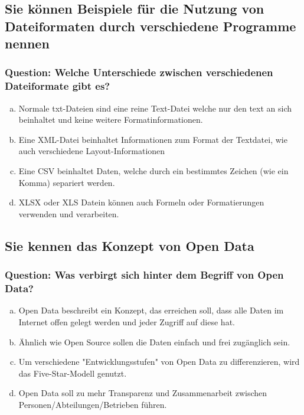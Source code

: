 \documentclass{article}
\begin{document}
\begin{adjustwidth}{2em}{2em}
\begin{adjustwidth}{2em}{2em}
			\subsection{Sie können Beispiele für die Nutzung von Dateiformaten durch verschiedene Programme nennen}
			\begin{adjustwidth}{1em}{}
				\subsubsection*{Question: Welche Unterschiede zwischen verschiedenen Dateiformate gibt es?}
				\begin{adjustwidth}{1em}{}
					\begin{enumerate}[(a)]
						\item Normale txt-Dateien sind eine reine Text-Datei welche nur den text an sich beinhaltet und keine weitere Formatinformationen.
						\item Eine XML-Datei beinhaltet Informationen zum Format der Textdatei, wie auch verschiedene Layout-Informationen
						\item Eine CSV beinhaltet Daten, welche durch ein bestimmtes Zeichen (wie ein Komma) separiert werden.
						\item XLSX oder XLS Datein können auch Formeln oder Formatierungen verwenden und verarbeiten.
					\end{enumerate}
				\end{adjustwidth}
			\end{adjustwidth}
			\subsection{Sie kennen das Konzept von Open Data}
			\begin{adjustwidth}{1em}{}
				\subsubsection*{Question: Was verbirgt sich hinter dem Begriff von Open Data?}
				\begin{adjustwidth}{1em}{}
					\begin{enumerate}[(a)]
						\item Open Data beschreibt ein Konzept, das erreichen soll, dass alle Daten im Internet offen gelegt werden und jeder Zugriff auf diese hat.
						\item Ähnlich wie Open Source sollen die Daten einfach und frei zugänglich sein. 
						\item Um verschiedene "Entwicklungsstufen" von Open Data zu differenzieren, wird das Five-Star-Modell genutzt.
						\item Open Data soll zu mehr Transparenz und Zusammenarbeit zwischen Personen/Abteilungen/Betrieben führen.
					\end{enumerate}
				\end{adjustwidth}
			\end{adjustwidth}

\end{adjustwidth}
\end{adjustwidth}
\end{document}
